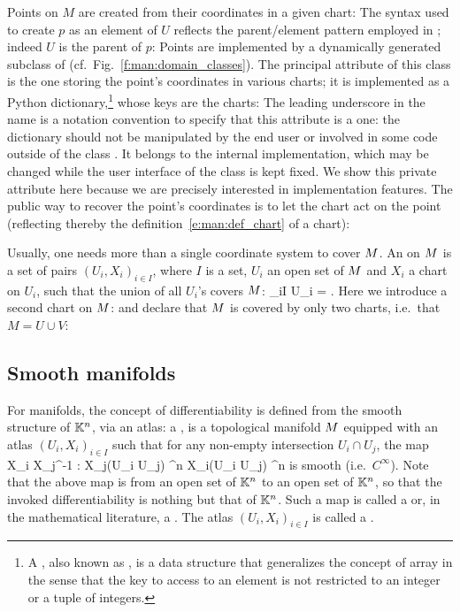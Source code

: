 Points on $M$ are created from their coordinates in a given
chart:
The syntax  used to create $p$ as an element of $U$
reflects the parent/element pattern employed in \Sage{}; indeed $U$
is the parent of $p$:
Points are implemented by a dynamically generated subclass of
 (cf.\ Fig.~\ref{f:man:domain_classes}).
The principal attribute of this class is the one storing the point's coordinates
in various charts; it is implemented as
a Python dictionary,\footnote{A ,
also known as , is a
data structure that generalizes the concept of array in the sense that the
key to access to an element is not restricted to an integer or a tuple of integers.} whose keys are the charts:
The leading underscore in the name  is a notation
convention to specify that this attribute is a  one:
the dictionary  should
not be manipulated by the end user or involved in some code
outside of the class .
It belongs to the internal implementation, which may be changed while
the user interface of the class  is kept fixed. We show
this private attribute here
because we are precisely interested in implementation features.
The public way to recover the point's coordinates is to let the chart act on
the point (reflecting thereby the definition~\eqref{e:man:def_chart} of a chart):

Usually, one needs more than a single coordinate system to cover $M$.
An  on $M$ is a set of pairs
$(U_i,X_i)_{i\in I}$, where $I$ is a set, $U_i$ an open set of $M$ and $X_i$ a chart on $U_i$,
such that the union of all $U_i$'s covers $M$:
\be
    \bigcup_{i\in I} U_i = \M.
\ee
Here we introduce a second chart on $M$:
and declare that $M$ is covered by only two charts, i.e.\ that $M=U\cup V$:

\subsection{Smooth manifolds}

For manifolds, the concept of differentiability is
defined from the smooth structure of $\mathbb{K}^n$, via an atlas:
a ,
is a topological manifold $M$ equipped with an atlas
$(U_i,X_i)_{i\in I}$ such that for any non-empty intersection
$U_i \cap U_j$, the map
\be \label{e:bas:transition_map}
    X_i \circ X_j^{-1} : X_j(U_i \cap U_j)
    \subset \K^n \longrightarrow X_i(U_i \cap U_j)
    \subset \K^n
\ee
is smooth (i.e.~$C^\infty$).
Note that the above map is from an open set of $\mathbb{K}^n$ to an open set of $\mathbb{K}^n$, so that the invoked differentiability is nothing but that of $\mathbb{K}^n$.
Such a map is called a  or, in the mathematical literature, a
.
The atlas $(U_i,X_i)_{i\in I}$ is called a
.

